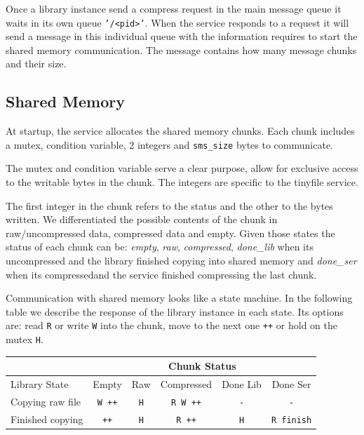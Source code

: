 \documentclass[12pt]{article}
\begin{document}
\par Once a library instance send a compress request in the main message queue it waits in its own queue \texttt{'/<pid>'}. When the service responds to a request it will send a message in this individual queue with the information requires to start the shared memory communication. The message contains how many message chunks and their size.

\newpage
\subsection*{Shared Memory}

\par At startup, the service allocates the shared memory chunks. Each chunk includes a mutex, condition variable, 2 integers and \texttt{sms\_size} bytes to communicate.

\par The mutex and condition variable serve a clear purpose, allow for exclusive access to the writable bytes in the chunk. The integers are specific to the tinyfile service.

\par The first integer in the chunk refers to the status and the other to the bytes written. We differentiated the possible contents of the chunk in raw/uncompressed data, compressed data and empty. Given those states the status of each chunk can be: \textit{empty}, \textit{raw}, \textit{compressed}, \textit{done\_lib} when its uncompressed and the library finished copying into shared memory and \textit{done\_ser} when its compressedand the service finished compressing the last chunk.

\par Communication with shared memory looks like a state machine. In the following table we describe the response of the library instance in each state. Its options are: read \texttt{R} or write \texttt{W} into the chunk, move to the next one \texttt{++} or hold on the mutex \texttt{H}.

\begin{table}[h]
\centering
\begin{tabular}{|l|c|c|c|c|c|}
\hline
\multicolumn{1}{|c|}{} & \multicolumn{5}{c|}{Chunk Status} \\ \hline
Library State & Empty & Raw & Compressed & Done Lib & Done Ser\\ \hline
Copying raw file & \texttt{W ++} & \texttt{H} & \texttt{R W ++}   & \texttt{-} & \texttt{-} \\
Finished copying & \texttt{++}   & \texttt{H} & \texttt{R ++}     & \texttt{H} & \texttt{R finish} \\ \hline
\end{tabular}
\end{table}
\end{document}
